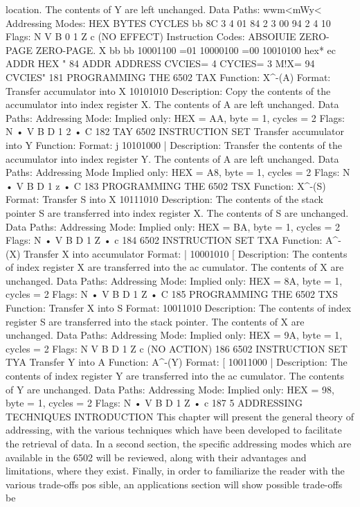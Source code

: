 \documentclass{book}
\begin{document}
location. The contents of Y are left unchanged.
Data Paths:
wwm<mWy<
Addressing Modes:
HEX
BYTES
CYCLES
bb
8C
3
4
01
84
2
3
00
94
2
4
10
Flags: N V B 0 1 Z c
(NO EFFECT)
Instruction Codes:
ABSOIUIE
ZERO-PAGE
ZERO-PAGE. X
bb
bb
10001100
=01
10000100
=00
10010100
hex* ec
ADDR
HEX " 84
ADDR
ADDRESS
CVCIES= 4
CYCIES= 3
M!X= 94 CVCIES"
181
PROGRAMMING THE 6502
TAX
Function:
X^-(A)
Format:
Transfer accumulator into X
10101010
Description:
Copy the contents of the accumulator into index register X. The
contents of A are left unchanged.
Data Paths:
Addressing Mode:
Implied only:
HEX = AA, byte = 1, cycles = 2
Flags:
N
•
V B D 1 2
•
C
182
TAY
6502 INSTRUCTION SET
Transfer accumulator into Y
Function:
Format: j 10101000 |
Description:
Transfer the contents of the accumulator into index register Y.
The contents of A are left unchanged.
Data Paths:
Addressing Mode
Implied only:
HEX = A8, byte = 1, cycles = 2
Flags:
N
•
V B D 1 z
•
C
183
PROGRAMMING THE 6502
TSX
Function:
X^-(S)
Format:
Transfer S into X
10111010
Description:
The contents of the stack pointer S are transferred into index
register X. The contents of S are unchanged.
Data Paths:
Addressing Mode:
Implied only:
HEX = BA, byte = 1, cycles = 2
Flags:
N
•
V B D 1 Z
•
c
184
6502 INSTRUCTION SET
TXA
Function:
A^-(X)
Transfer X into accumulator
Format: | 10001010 [
Description:
The contents of index register X are transferred into the ac
cumulator. The contents of X are unchanged.
Data Paths:
Addressing Mode:
Implied only:
HEX = 8A, byte = 1, cycles = 2
Flags:
N
•
V B D 1 Z
•
C
185
PROGRAMMING THE 6502
TXS
Function:
Transfer X into S
Format: 10011010
Description:
The contents of index register S are transferred into the stack
pointer. The contents of X are unchanged.
Data Paths:
Addressing Mode:
Implied only:
HEX = 9A, byte = 1, cycles = 2
Flags:
N V B D 1 Z c
(NO ACTION)
186
6502 INSTRUCTION SET
TYA Transfer Y into A
Function:
A^-(Y)
Format: [ 10011000 |
Description:
The contents of index register Y are transferred into the ac
cumulator. The contents of Y are unchanged.
Data Paths:
Addressing Mode:
Implied only:
HEX = 98, byte = 1, cycles = 2
Flags:
N
•
V B D 1 Z
•
c
187
5
ADDRESSING TECHNIQUES
INTRODUCTION
This chapter will present the general theory of addressing, with
the various techniques which have been developed to facilitate
the retrieval of data. In a second section, the specific addressing
modes which are available in the 6502 will be reviewed, along
with their advantages and limitations, where they exist. Finally,
in order to familiarize the reader with the various trade-offs pos
sible, an applications section will show possible trade-offs be
\end{document}
